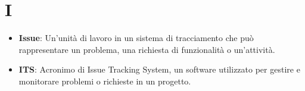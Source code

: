 \section{I}
\begin{itemize}
    \item \textbf{Issue}: Un'unità di lavoro in un sistema di tracciamento che può rappresentare un problema, una richiesta di funzionalità o un'attività.
    \item \textbf{ITS}: Acronimo di Issue Tracking System, un software utilizzato per gestire e monitorare problemi o richieste in un progetto.
\end{itemize}
